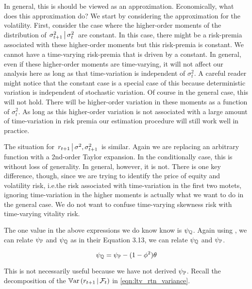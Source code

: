 \documentclass[11pt, letterpaper, twoside, final]{article}
\begin{document}
In general, this is should be viewed as an approximation.
Economically, what does this approximation do?
We start by considering the approximation for the volatility.
First, consider the case where  the higher-order moments of the distribution of $\left. \sigma^2_{t+1}
\,\middle\vert\, \sigma^2_t \right.$ are constant. 
In this case, there might be a risk-premia associated with these higher-order moments but this risk-premia is
constant.
We cannot have a time-varying risk-premia that is driven by a constant.
In general, even if these higher-order moments are time-varying, it will not affect our analysis here as long as
that time-variation is independent of $\sigma^2_t$.
A careful reader might notice that the constant case is a special case of this because deterministic variation is
independent  of stochastic variation.
Of course in the general case, this will not hold.
There will be higher-order variation in these moments as a function of $\sigma^2_t$. 
As long as this higher-order variation is not associated with a large amount of time-variation in risk premia our
estimation procedure will still work well in practice.

The situation for $\left. r_{t+1} \,\middle\vert\, \sigma^2, \sigma^2_{t+1} \right.$ is similar.
Again we are replacing an arbitrary function with a 2nd-order Taylor expansion.
In the conditionally case, this is without loss of generality.
In general, however, it is not.
There is one key difference, though, since we are trying to identify the price of equity and volatility risk,
i.e.\@ the risk associated with time-variation in the first two motets, ignoring time-variation in the higher
moments is actually what we want to do in the general case.
We do not want to confuse time-varying skewness risk with time-varying vitality risk.

The one value in the above expressions we do know know is $\psi_{\mathbb{Q}}$. 
Again using \textcite[Proposition 5]{khrapov2016affine}, we can relate $\psi_{\mathbb{P}}$ and $\psi_{\mathbb{Q}}$ as in their
Equation 3.13, we can relate $\psi_{\mathbb{Q}}$ and $\psi_{\mathbb{P}}$.

\begin{equation}
    \psi_{\mathbb{Q}} = \psi_{\mathbb{P}} - (1- \phi^2) \theta 
\end{equation}

This is not necessarily useful because we have not derived $\psi_{\mathbb{P}}$.
Recall the decomposition of the $\operatorname{\mathbb{V}ar}\left(r_{t+1} \,\middle\vert\, \mathcal{F}_t\right)$ in \cref{eqn:ltv_rtn_variance}.
\end{document}
